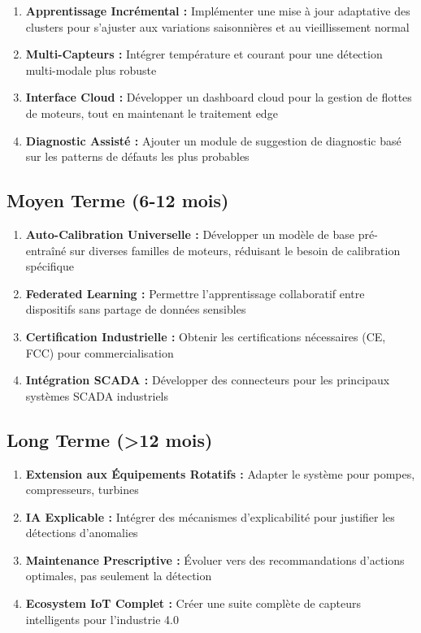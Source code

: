 \begin{enumerate}
    \item \textbf{Apprentissage Incrémental :} Implémenter une mise à jour adaptative des clusters pour s'ajuster aux variations saisonnières et au vieillissement normal
    
    \item \textbf{Multi-Capteurs :} Intégrer température et courant pour une détection multi-modale plus robuste
    
    \item \textbf{Interface Cloud :} Développer un dashboard cloud pour la gestion de flottes de moteurs, tout en maintenant le traitement edge
    
    \item \textbf{Diagnostic Assisté :} Ajouter un module de suggestion de diagnostic basé sur les patterns de défauts les plus probables
\end{enumerate}

\subsection*{Moyen Terme (6-12 mois)}

\begin{enumerate}
    \item \textbf{Auto-Calibration Universelle :} Développer un modèle de base pré-entraîné sur diverses familles de moteurs, réduisant le besoin de calibration spécifique
    
    \item \textbf{Federated Learning :} Permettre l'apprentissage collaboratif entre dispositifs sans partage de données sensibles
    
    \item \textbf{Certification Industrielle :} Obtenir les certifications nécessaires (CE, FCC) pour commercialisation
    
    \item \textbf{Intégration SCADA :} Développer des connecteurs pour les principaux systèmes SCADA industriels
\end{enumerate}

\subsection*{Long Terme (>12 mois)}

\begin{enumerate}
    \item \textbf{Extension aux Équipements Rotatifs :} Adapter le système pour pompes, compresseurs, turbines
    
    \item \textbf{IA Explicable :} Intégrer des mécanismes d'explicabilité pour justifier les détections d'anomalies
    
    \item \textbf{Maintenance Prescriptive :} Évoluer vers des recommandations d'actions optimales, pas seulement la détection
    
    \item \textbf{Ecosystem IoT Complet :} Créer une suite complète de capteurs intelligents pour l'industrie 4.0
\end{enumerate}

